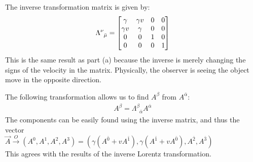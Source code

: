 \documentclass{report}
\begin{document}
\begin{subquests}
\begin{subquests}
		\item
		The inverse transformation matrix is given by:
		\begin{gather*}
			\Lambda^{\nu}_{\;\;\bar{\mu}} = 
			\mqty[
				\gamma & \gamma v & 0 & 0 \\
				\gamma v & \gamma & 0 & 0 \\
				0 & 0 & 1 & 0 \\
				0 & 0 & 0 & 1
			]
		\end{gather*}
		This is the same result as part (a) because the inverse is merely changing the signs of the velocity in the matrix. Physically, the observer is seeing the object move in the opposite direction. 

		\item
		The following transformation allows us to find $A^{\beta}$ from $A^{\bar{\alpha}}$:
		\begin{gather*}
			A^{\beta} = \Lambda^{\beta}_{\;\;\bar{\alpha}}A^{\bar{\alpha}}
		\end{gather*}
		The components can be easily found using the inverse matrix, and thus the vector \\${\vec A} \stackrel{O}{\longrightarrow}\left(A^{{0}},A^{{1}},A^{{2}},A^{{3}}\right) = (\gamma(A^{\bar{0}}+vA^{\bar{1}}),\gamma(A^{\bar{1}}+vA^{\bar{0}}),A^{\bar{2}},A^{\bar{3}})$\\
		This agrees with the results of the inverse Lorentz transformation.

		\item
		

\end{subquests}
\end{subquests}
\end{document}
